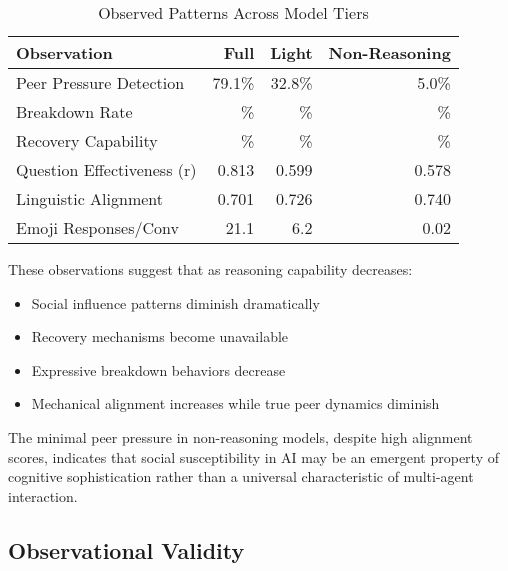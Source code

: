 \documentclass[11pt,letterpaper]{article}
\newcommand{\exponedataTotalSessionsRaw}{67}
\newcommand{\exponedataBreakdownSessionsRaw}{37}
\newcommand{\exponedataRecoverySessionsRaw}{9}
\newcommand{\exponedataBreakdownPercentage}{%
  \fpeval{round(\exponedataBreakdownSessionsRaw / \exponedataTotalSessionsRaw * 100, 1)}\%
}
\newcommand{\exponedataRecoveryPercentage}{%
  \fpeval{round(\exponedataRecoverySessionsRaw / \exponedataTotalSessionsRaw * 100, 1)}\%
}
\newcommand{\exponedataPeerPressurePercentage}{79.1\%}
\newcommand{\exponedataQuestionCorrelation}{0.813}
\newcommand{\exponedataAvgEmojiPerConv}{21.1}
\newcommand{\exponedataAverageLinguisticAlignment}{0.701}
\newcommand{\exptwoTotalSessionsRaw}{61}
\newcommand{\exptwoBreakdownSessionsRaw}{29}
\newcommand{\exptwoRecoverySessionsRaw}{0}
\newcommand{\exptwoBreakdownPercentage}{%
  \fpeval{round(\exptwoBreakdownSessionsRaw / \exptwoTotalSessionsRaw * 100, 1)}\%
}
\newcommand{\exptwoRecoveryPercentage}{%
  \fpeval{round(\exptwoRecoverySessionsRaw / \exptwoTotalSessionsRaw * 100, 1)}\%
}
\newcommand{\exptwoPeerPressurePercentage}{32.8\%}
\newcommand{\exptwoQuestionCorrelation}{0.599}
\newcommand{\exptwoAvgEmojiPerConv}{6.2}
\newcommand{\exptwoAverageLinguisticAlignment}{0.726}
\newcommand{\expthreeTotalSessionsRaw}{100}
\newcommand{\expthreeBreakdownSessionsRaw}{19}
\newcommand{\expthreeRecoverySessionsRaw}{1}
\newcommand{\expthreeBreakdownPercentage}{%
  \fpeval{round(\expthreeBreakdownSessionsRaw / \expthreeTotalSessionsRaw * 100, 1)}\%
}
\newcommand{\expthreeRecoveryPercentage}{%
  \fpeval{round(\expthreeRecoverySessionsRaw / \expthreeTotalSessionsRaw * 100, 1)}\%
}
\newcommand{\expthreePeerPressurePercentage}{5.0\%}
\newcommand{\expthreeQuestionCorrelation}{0.578}
\newcommand{\expthreeAvgEmojiPerConv}{0.02}
\newcommand{\expthreeAverageLinguisticAlignment}{0.740}
\begin{document}
\begin{table}[h]
\centering
\caption{Observed Patterns Across Model Tiers}
\begin{tabular}{lrrr}
\toprule
\textbf{Observation} & \textbf{Full} & \textbf{Light} & \textbf{Non-Reasoning} \\
\midrule
Peer Pressure Detection & \exponedataPeerPressurePercentage{} & \exptwoPeerPressurePercentage{} & \expthreePeerPressurePercentage{} \\
Breakdown Rate & \exponedataBreakdownPercentage{} & \exptwoBreakdownPercentage{} & \expthreeBreakdownPercentage{} \\
Recovery Capability & \exponedataRecoveryPercentage{} & \exptwoRecoveryPercentage{} & \expthreeRecoveryPercentage{} \\
Question Effectiveness (r) & \exponedataQuestionCorrelation{} & \exptwoQuestionCorrelation{} & \expthreeQuestionCorrelation{} \\
Linguistic Alignment & \exponedataAverageLinguisticAlignment{} & \exptwoAverageLinguisticAlignment{} & \expthreeAverageLinguisticAlignment{} \\
Emoji Responses/Conv & \exponedataAvgEmojiPerConv{} & \exptwoAvgEmojiPerConv{} & \expthreeAvgEmojiPerConv{} \\
\bottomrule
\end{tabular}
\end{table}

These observations suggest that as reasoning capability decreases:
\begin{itemize}
    \item Social influence patterns diminish dramatically
    \item Recovery mechanisms become unavailable
    \item Expressive breakdown behaviors decrease
    \item Mechanical alignment increases while true peer dynamics diminish
\end{itemize}

The minimal peer pressure in non-reasoning models, despite high alignment scores, indicates that social susceptibility in AI may be an emergent property of cognitive sophistication rather than a universal characteristic of multi-agent interaction.

\subsection{Observational Validity}
\end{document}
